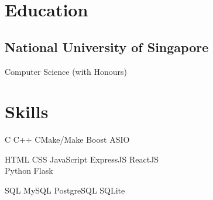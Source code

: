 \documentclass[a4paper,hidelinks]{resume} %
\begin{document}
\begin{minipage}[t]{0.49\textwidth} %

    
    \section{Education}
    
    \sectionspace %
    
    \subsection{National University of Singapore}
    
     {Computer Science (with Honours)} \\
    
    \sectionspace %
    
    
    \section{Skills}
    
    \sectionspace %
    
    
    C \textbullet{} C++ \textbullet{} CMake/Make \textbullet{} Boost \textbullet{} ASIO \\
    
    
    HTML \textbullet{} CSS \textbullet{} JavaScript \textbullet{} ExpressJS \textbullet{} ReactJS \\ \textbullet{} Python \textbullet{} Flask\\
    
    
    SQL \textbullet{} MySQL \textbullet{} PostgreSQL \textbullet{} SQLite \\
    

\end{minipage}
\end{document}
